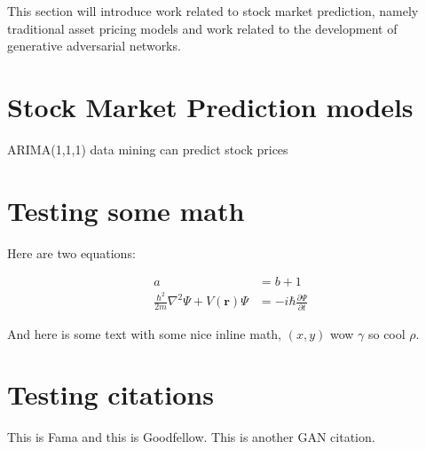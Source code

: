 This section will introduce work related to stock market prediction, namely traditional asset pricing models and work related to the development of generative adversarial networks.
\section{Stock Market Prediction models}
ARIMA(1,1,1)
data mining can predict stock prices \cite{stockprediction_datamining}


\section{Testing some math}
Here are two equations:

\begin{align}
a &= b + 1 \\
\frac{\hbar^2}{2m}\nabla^2\Psi + V(\mathbf{r})\Psi
&= -i\hbar \frac{\partial\Psi}{\partial t}    
\end{align}


And here is some text with some nice inline math, $(x, y)$ wow $\gamma$ so cool $\rho$.


\section{Testing citations}
This is Fama\cite{fama_efficient_market} and this is Goodfellow.
This is another GAN citation.